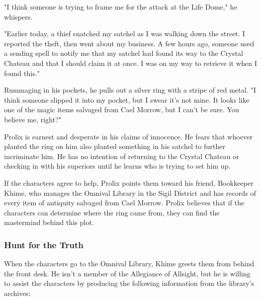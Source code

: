 \documentclass[10pt,a4paper,twoside,bg=print,twocolumn,openany,nodeprecatedcode]{dndbook}
\begin{document}
\begin{DndReadAloud}{}
"I think someone is trying to frame me for the attack at the Life Dome," he whispers.

"Earlier today, a thief snatched my satchel as I was walking down the street. I reported the theft, then went about my business. A few hours ago, someone used a sending spell to notify me that my satchel had found its way to the Crystal Chateau and that I should claim it at once. I was on my way to retrieve it when I found this."

Rummaging in his pockets, he pulls out a silver ring with a stripe of red metal. "I think someone slipped it into my pocket, but I swear it's not mine. It looks like one of the magic items salvaged from Cael Morrow, but I can't be sure. You believe me, right?"

\end{DndReadAloud}

Prolix is earnest and desperate in his claims of innocence. He fears that whoever planted the ring on him also planted something in his satchel to further incriminate him. He has no intention of returning to the Crystal Chateau or checking in with his superiors until he learns who is trying to set him up.

If the characters agree to help, Prolix points them toward his friend, Bookkeeper Khime, who manages the Omnival Library in the Sigil District and has records of every item of antiquity salvaged from Cael Morrow. Prolix believes that if the characters can determine where the ring came from, they can find the mastermind behind this plot.

\subsubsection{Hunt for the Truth}
When the characters go to the Omnival Library, Khime greets them from behind the front desk. He isn't a member of the Allegiance of Allsight, but he is willing to assist the characters by producing the following information from the library's archives:
\end{document}

